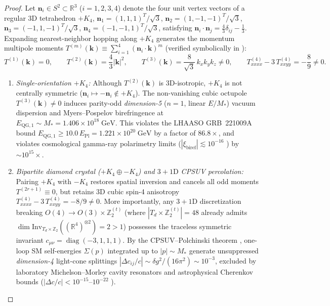 \documentclass[11pt,a4paper]{article}
\begin{document}
\begin{proof}
Let $\mathbf{n}_i \in S^2 \subset \mathbb{R}^3$ ($i = 1,2,3,4$) denote the four unit vertex vectors of a regular 3D tetrahedron $+K_4$, $\mathbf{n}_1 = (1,1,1)^T/\sqrt{3}$, $\mathbf{n}_2 = (1,-1,-1)^T/\sqrt{3}$, $\mathbf{n}_3 = (-1,1,-1)^T/\sqrt{3}$, $\mathbf{n}_4 = (-1,-1,1)^T/\sqrt{3}$, satisfying $\mathbf{n}_i\cdot\mathbf{n}_j = \frac{4}{3}\delta_{ij} - \frac{1}{3}$. Expanding nearest-neighbor hopping along $+K_4$ generates the momentum multipole moments $T^{(m)}(\mathbf{k}) \equiv \sum_{i=1}^4 (\mathbf{n}_i\cdot\mathbf{k})^m$ (verified symbolically in ):
\begin{equation}
T^{(1)}(\mathbf{k}) = 0, \qquad
T^{(2)}(\mathbf{k}) = \frac{4}{3}|\mathbf{k}|^2, \qquad
T^{(3)}(\mathbf{k}) = \frac{8}{\sqrt{3}}\,k_x k_y k_z \neq 0, \qquad
T^{(4)}_{xxxx} - 3\,T^{(4)}_{xxyy} = -\frac{8}{9} \neq 0.
\label{eq:3d-k4-moments}
\end{equation}
\begin{enumerate}[label=(\roman*),leftmargin=1.9em,itemsep=2pt]
\item \emph{Single-orientation $+K_4$:} Although $T^{(2)}(\mathbf{k})$ is 3D-isotropic, $+K_4$ is not centrally symmetric ($\mathbf{n}_i \mapsto -\mathbf{n}_i \notin +K_4$). The non-vanishing cubic octupole $T^{(3)}(\mathbf{k}) \neq 0$ induces parity-odd \emph{dimension-5} ($n=1$, linear $E/M_*$) vacuum dispersion and Myers--Pospelov birefringence at $E_{\mathrm{QG},1} \sim M_* = 1.406\times 10^{18}\;\mathrm{GeV}$. This violates the LHAASO GRB~221009A bound $E_{\mathrm{QG},1} \ge 10.0\,E_{\mathrm{Pl}} = 1.221\times 10^{20}\;\mathrm{GeV}$ \cite{LHAASO2024LIV} by a factor of $86.8\times$, and violates cosmological gamma-ray polarimetry limits ($|\xi_{\mathrm{biref}}| \lesssim 10^{-16}$ \cite{Liberati2013}) by $\sim 10^{15}\times$.
\item \emph{Bipartite diamond crystal ($+K_4 \oplus -K_4$) and $3+1\mathrm{D}$ CPSUV percolation:} Pairing $+K_4$ with $-K_4$ restores spatial inversion and cancels all odd moments $T^{(2r+1)} \equiv 0$, but retains 3D cubic spin-4 anisotropy $T^{(4)}_{xxxx} - 3\,T^{(4)}_{xxyy} = -8/9 \neq 0$. More importantly, any $3+1\mathrm{D}$ discretization breaking $O(4) \to O(3)\times\mathbb{Z}_2^{(t)}$ (where $|T_d\times\mathbb{Z}_2^{(t)}| = 48$ already admits $\dim\mathrm{Inv}_{T_d\times\mathbb{Z}_2}((\mathbb{R}^4)^{\otimes 2}) = 2 > 1$) possesses the traceless symmetric invariant $c_{\mu\nu} = \operatorname{diag}(-3,1,1,1)$. By the CPSUV--Polchinski theorem \cite{CPSUV2004,Polchinski2012}, one-loop SM self-energies $\Sigma(p)$ integrated up to $|p| \sim M_*$ generate unsuppressed \emph{dimension-4} light-cone splittings $|\Delta c_{ij}/c| \sim \delta g^2/(16\pi^2) \sim 10^{-3}$, excluded by laboratory Michelson--Morley cavity resonators and astrophysical Cherenkov bounds ($|\Delta c/c| < 10^{-15}\text{--}10^{-22}$ \cite{KosteleckyMewes2002,Liberati2013}). \qedhere
\end{enumerate}
\end{proof}
\end{document}
